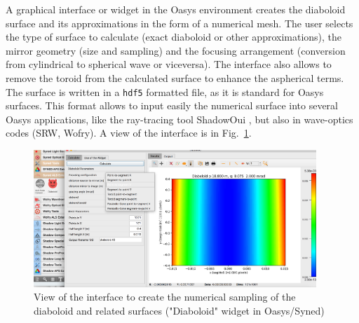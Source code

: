\documentclass{iucr}              %
\begin{document}
A graphical interface or widget in the Oasys environment  creates the diaboloid surface and its approximations in the form of a numerical mesh. The user selects the type of surface to calculate (exact diaboloid or other approximations), the mirror geometry (size and sampling) and the focusing arrangement (conversion from cylindrical to spherical wave or viceversa). The interface also allows to remove the toroid from the calculated surface to enhance the aspherical terms. The surface is written in a {\tt hdf5} formatted file, as it is standard for Oasys surfaces. This format allows to input easily the numerical surface into several Oasys applications, like the ray-tracing tool ShadowOui \cite{codeSHADOWOUI}, but also in wave-optics codes (SRW, Wofry). A view of the interface is in Fig.~\ref{fig:widget}.

\begin{figure}\label{fig:widget}
\centering
\includegraphics[width=0.95\textwidth]{figures/widget.png}
\caption{View of the interface to create the numerical sampling of the diaboloid and related surfaces ("Diaboloid" widget in Oasys/Syned) }
\end{figure}


\end{document}
